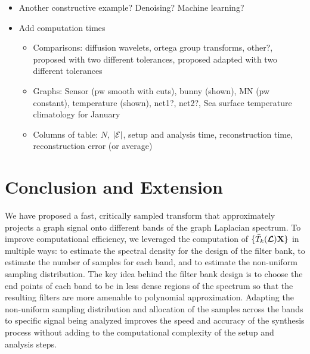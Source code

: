\documentclass[journal, 10pt]{IEEEtran}
\begin{document}
{\color{red}
\begin{itemize}
\item Another constructive example? Denoising? Machine learning? 
\item Add computation times
\begin{itemize}
\item Comparisons: diffusion wavelets, ortega group transforms, other?, proposed with two different tolerances, proposed adapted with two different tolerances
\item Graphs: Sensor (pw smooth with cuts), bunny (shown), MN (pw constant), temperature (shown), net1?, net2?, Sea surface temperature climatology for January 
\item Columns of table: $N$, $|{\mathcal{E}}|$, setup and analysis time, reconstruction time, reconstruction error (or average)
\end{itemize}
\end{itemize}
}





\section{Conclusion and Extension}
\label{Sec:ongoing}
We have proposed a fast, critically sampled transform that approximately projects a graph signal onto different bands of the graph Laplacian spectrum. To improve computational efficiency, we leveraged the computation of $\{\bar{T}_k(\boldsymbol{\mathcal{L}}){\bf X}\}$ in multiple ways: to estimate the spectral density for the design of the filter bank, to estimate the number of samples for each band, and to estimate the non-uniform sampling distribution. The key idea behind the filter bank design is to choose the end points of each band to be in less dense regions of the spectrum so that the resulting filters are more amenable to polynomial approximation. Adapting the non-uniform sampling distribution and allocation of the samples across the bands to specific signal being analyzed improves the speed and accuracy of the synthesis process without adding to the computational complexity of the setup and analysis steps. 
\end{document}
